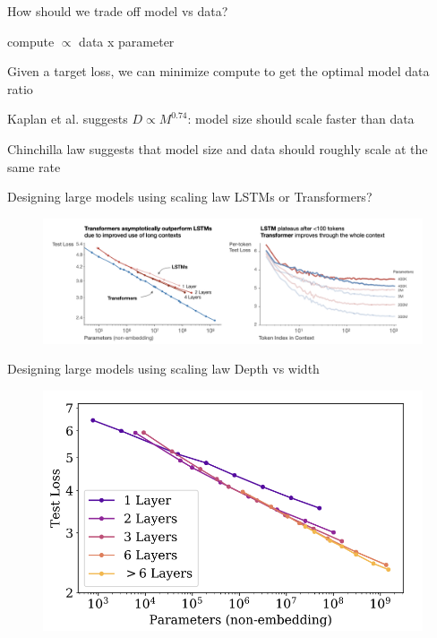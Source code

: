 \documentclass[usenames,dvipsnames,notes,11pt,aspectratio=169,hyperref={colorlinks=true, linkcolor=blue}]{beamer}
\begin{document}
\begin{frame}
    {How should we trade off model vs data?}
    \begin{wideitemize}
        \item compute $\propto$ data x parameter
        \item Given a target loss, we can minimize compute to get  the optimal  model data ratio
        \item Kaplan et al. suggests $D \propto M^{0.74}$: model size should scale faster than data
        \item Chinchilla law suggests that model size and data should roughly scale at the same rate
    \end{wideitemize}
\end{frame}

\begin{frame}
    {Designing large models using scaling law}
    LSTMs or Transformers?

    \begin{figure}
        \includegraphics[height=0.5\textheight]{figures/lstm-vs-transformer}
        \caption{}
    \end{figure}
\end{frame}

\begin{frame}
    {Designing large models using scaling law}
    Depth vs width

    \begin{figure}
        \includegraphics[height=0.5\textheight]{figures/depth-vs-width}
        \caption{}
    \end{figure}
\end{frame}
\end{document}
